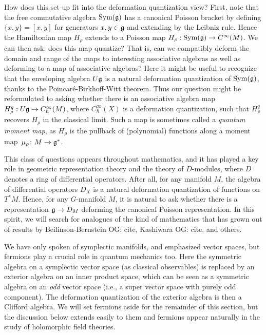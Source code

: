\documentclass[11pt]{amsart}
\def\owen#1{{\textcolor{violet!50!black}{OG: {#1}}}}
\begin{document}
How does this set-up fit into the deformation quantization view?
First, note that the free commutative algebra $\operatorname{Sym}(\mathfrak g)$ has a canonical Poisson bracket by defining $ \{x, y \}   = [x, y]$ for generators $x, y \in \mathfrak g$ and extending by the Leibniz rule.
Hence the Hamiltonian map $H_\rho$ extends to a Poisson map $H_\rho: \operatorname{Sym}(\mathfrak g) \to C^\infty(M)$.
We can then ask: does this map quantize? That is, can we compatibly deform the domain and range of the maps to interesting associative algebras as well as deforming to a map of associative algebras?
Here it might be useful to recognize that the enveloping algebra $U\mathfrak g$ is a natural deformation quantization of $\operatorname{Sym}(\mathfrak g)$, thanks to the Poincar\'e-Birkhoff-Witt theorem.
Thus our question might be reformulated to asking whether there is an associative algebra map $H^q_\rho: U\mathfrak g \to C_\hbar^\infty(M)$, where $C_\hbar^\infty(X)$ is a deformation quantization, such that $H^q_\rho$ recovers $H_\rho$ in the classical limit.
Such a map is sometimes called a {\em quantum moment map},
as $H_\rho$ is the pullback of (polynomial) functions along a moment map~$\mu_\rho \colon M \to \mathfrak g^*$.

This class of questions appears throughout mathematics,
and it has played a key role in geometric representation theory and the theory of $D$-modules, where $D$ denotes a ring of differential operators.
After all, for any manifold $M$, the algebra of differential operators $D_X$ is a natural deformation quantization of functions on $T^* M$.
Hence, for any $G$-manifold $M$, it is natural to ask whether there is a representation $\mathfrak g \to D_M$ deforming the canonical Poisson representation.
In this spirit, we will search for analogues of the kind of mathematics that has grown out of results by Beilinson-Bernstein \owen{cite}, Kashiwara \owen{cite}, and others.

\begin{rmk}
We have only spoken of symplectic manifolds, and emphasized vector spaces,
but fermions play a crucial role in quantum mechanics too.
Here the symmetric algebra on a symplectic vector space (as classical observables) 
is replaced by an exterior algebra on an inner product space,
which can be seen as a symmetric algebra on an {\em odd} vector space
(i.e., a super vector space with purely odd component).
The deformation quantization of the exterior algebra is then a Clifford algebra.
We will set fermions aside for the remainder of this section,
but the discussion below extends easily to them and fermions appear naturally in the study of holomorphic field theories.
\end{rmk}
\end{document}
